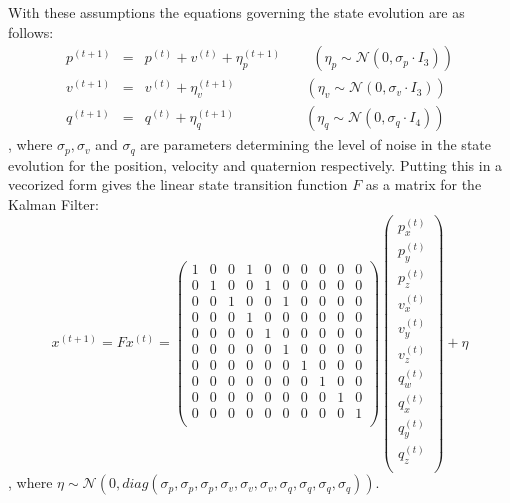 \documentclass{article}
\begin{document}
With these assumptions the equations governing the state evolution are as follows:
\begin{eqnarray}
	p^{(t+1)} &=& p^{(t)} + v^{(t)} + \eta^{(t+1)}_{p} \label{pos_update} \qquad ~ \left( \eta_p \sim \mathcal{N}(0, \sigma_p \cdot I_3) \right)\\
	v^{(t+1)} &=& v^{(t)} + \eta^{(t+1)}_{v} \label{velocity_update} \qquad \qquad \quad \left( \eta_v \sim \mathcal{N}(0, \sigma_v \cdot I_3) \right)\\
	q^{(t+1)} &=& q^{(t)} + \eta^{(t+1)}_{q} \label{quat_update}  \qquad \qquad \quad \left( \eta_q \sim \mathcal{N}(0, \sigma_q \cdot I_4) \right)
\end{eqnarray}
, where $\sigma_p, \sigma_v$ and $\sigma_q$ are parameters determining the level of noise in the state evolution for the position, velocity and quaternion respectively. Putting this in a vecorized form gives the linear state transition function $F$ as a matrix for the Kalman Filter:
\begin{equation}
	x^{(t+1)} = Fx^{(t)} = 
	\begin{pmatrix}
	1 & 0 & 0 & 1 & 0 & 0 & 0 & 0 & 0 & 0 \\
	0 & 1 & 0 & 0 & 1 & 0 & 0 & 0 & 0 & 0 \\
	0 & 0 & 1 & 0 & 0 & 1 & 0 & 0 & 0 & 0 \\
	0 & 0 & 0 & 1 & 0 & 0 & 0 & 0 & 0 & 0 \\
	0 & 0 & 0 & 0 & 1 & 0 & 0 & 0 & 0 & 0 \\
	0 & 0 & 0 & 0 & 0 & 1 & 0 & 0 & 0 & 0 \\
	0 & 0 & 0 & 0 & 0 & 0 & 1 & 0 & 0 & 0 \\
	0 & 0 & 0 & 0 & 0 & 0 & 0 & 1 & 0 & 0 \\
	0 & 0 & 0 & 0 & 0 & 0 & 0 & 0 & 1 & 0 \\
	0 & 0 & 0 & 0 & 0 & 0 & 0 & 0 & 0 & 1 \\
	\end{pmatrix}
	\begin{pmatrix}
	p^{(t)}_x \\
	p^{(t)}_y \\
	p^{(t)}_z \\
	v^{(t)}_x \\
	v^{(t)}_y \\
	v^{(t)}_z \\
	q^{(t)}_w \\
	q^{(t)}_x \\
	q^{(t)}_y \\
	q^{(t)}_z \\
	\end{pmatrix} + \eta 
\end{equation}, where $\eta \sim \mathcal{N}(0, diag(\sigma_p, \sigma_p, \sigma_p, \sigma_v, \sigma_v, \sigma_v, \sigma_q, \sigma_q, \sigma_q, \sigma_q))$.
\end{document}
